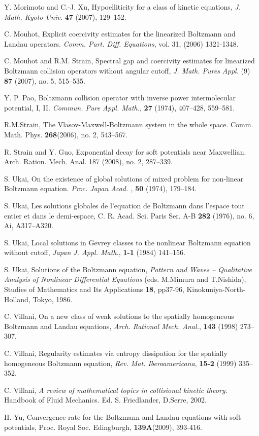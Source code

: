 \documentclass{amsart}[12pt, article]
\begin{document}
\begin{thebibliography}{99}
Y. Morimoto and C.-J. Xu, Hypoelliticity for a class
of kinetic equations, {\it J. Math. Kyoto Univ.} {\bf 47} (2007), 129--152.

 C. Mouhot, Explicit coercivity estimates for the linearized Boltzmann and Landau operators. { \it Comm. Part. Diff. Equations}, vol. 31, (2006) 1321-1348.

 C. Mouhot and R.M. Strain, { Spectral gap and coercivity estimates
for linearized Boltzmann collision
operators without angular cutoff},  {\it J. Math. Pures Appl. } (9)  {\bf 87}  (2007),  no. 5, 515--535.

Y. P. Pao, Boltzmann collision operator with inverse power
intermolecular potential, I, II. {\it Commun. Pure Appl. Math.},
{\bf 27} (1974), 407--428, 559--581.

 R.M.Strain, 
The Vlasov-Maxwell-Boltzmann system in the whole space. 
Comm. Math. Phys. {\bf 268}(2006), no. 2, 543--567.

 R. Strain and Y. Guo, Exponential decay for soft potentials near Maxwellian.  Arch. Ration. Mech. Anal.  187  (2008),  no. 2, 287--339. 

S. Ukai, On the existence of global solutions of mixed problem for non-linear Boltzmann equation.  {\it Proc. Japan Acad. ,} {\bf  50  } (1974), 179--184.

S. Ukai, Les solutions globales de l'equation de Boltzmann dans l'espace tout entier et dans le demi-espace,  C. R. Acad. Sci. Paris Ser. A-B  {\bf 282 } (1976), no. 6, Ai, A317--A320.

S. Ukai, Local solutions in Gevrey classes
to the nonlinear Boltzmann equation
without cutoff, {\it Japan J. Appl. Math.}, {\bf 1-1} (1984) 141--156.

 S. Ukai,
Solutions of the Boltzmann equation,
\textit{Pattern and Waves -- Qualitative Analysis of Nonlinear Differential
Equations} (eds. M.Mimura and T.Nishida), Studies of Mathematics and Its
Applications {\bf 18}, pp37-96, Kinokuniya-North-Holland, Tokyo, 1986.

C. Villani, On a new class of weak solutions to the spatially
homogeneous Boltzmann and Landau equations, {\it Arch. Rational
Mech. Anal.}, {\bf 143} (1998) 273--307.

C. Villani, Regularity estimates via entropy dissipation for the spatially
homogeneous Boltzmann equation, {\it Rev. Mat. Iberoamericana}, {\bf 15-2} (1999) 335--352.

C. Villani, {\it A review of mathematical
topics in collisional kinetic theory}.
Handbook of Fluid Mechanics. Ed. S. Friedlander, D.Serre, 2002.

H. Yu, Convergence rate for the Boltzmann and Landau equations with soft potentials, Proc. Royal Soc. Edingburgh, {\bf 139A}(2009), 393-416. 

\end{thebibliography}
\end{document}
